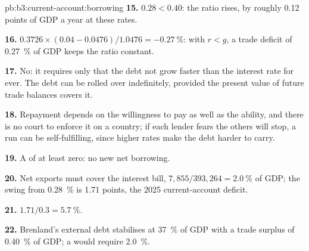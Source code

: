 \begin{solution}{pb:b3:current-account:borrowing}
\textbf{15.} $0.28 < 0.40$: the ratio rises, by roughly 0.12 points of GDP a year at
these rates.

\textbf{16.} $0.3726 \times (0.04 - 0.0476)/1.0476 = -0.27~\%$: with $r < g$, a trade deficit of
0.27~\% of GDP keeps the ratio constant.

\textbf{17.} No: it requires only that the debt not grow faster than the interest
rate for ever. The debt can be rolled over indefinitely, provided the present value
of future trade balances covers it.

\textbf{18.} Repayment depends on the willingness to pay as well as the ability,
and there is no court to enforce it on a country; if each lender fears the others
will stop, a run can be self-fulfilling, since higher rates make the debt harder to
carry.

\textbf{19.} A  of at least zero: no new net borrowing.

\textbf{20.} Net exports must cover the interest bill, $7{,}855/393{,}264 = 2.0~\%$ of GDP; the
swing from 0.28~\% is 1.71 points, the 2025 current-account deficit.

\textbf{21.} $1.71/0.3 = 5.7~\%$.

\textbf{22.} Brenland's external debt stabilises at 37~\% of GDP with a trade surplus
of 0.40~\% of GDP; a  would require 2.0~\%.
\end{solution}
